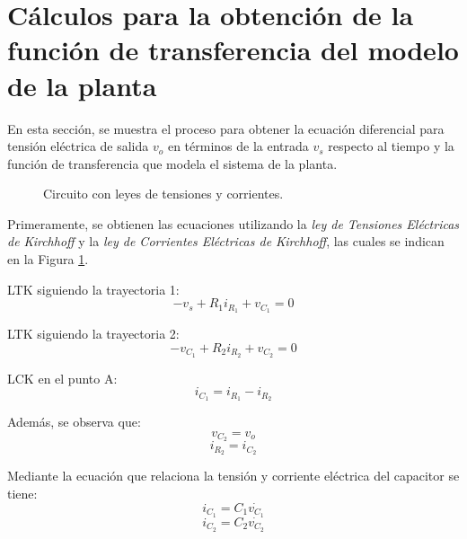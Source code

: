 
\appendices
\section{Cálculos para la obtención de la función de transferencia del modelo de la planta}\label{anexoA}

En esta sección, se muestra el proceso para obtener la ecuación diferencial para tensión eléctrica de salida $v_o$ en términos de la entrada $v_s$ respecto al tiempo y la función de transferencia que modela el sistema de la planta.

\begin{figure}[htbp]
    \centering
    \caption{Circuito con leyes de tensiones y corrientes.}
    \label{circ_leyes}
\end{figure}

Primeramente, se obtienen las ecuaciones utilizando la \textit{ley de Tensiones Eléctricas de Kirchhoff} y la \textit{ley de Corrientes Eléctricas de Kirchhoff}, las cuales se indican en la Figura \ref{circ_leyes}.

LTK siguiendo la trayectoria 1:
\begin{equation}
    -v_s + R_1 i_{R_1} + v_{C_1} = 0
    \label{LTK1}
\end{equation}

LTK siguiendo la trayectoria 2:
\begin{equation}
    -v_{C_1} + R_2 i_{R_2} + v_{C_2} = 0
    \label{LTK2}
\end{equation}

LCK en el punto A:
\begin{equation}
    i_{C_1} = i_{R_1} - i_{R_2}
    \label{LCK}
\end{equation}

Además, se observa que:
\begin{equation}
    v_{C_2} = v_o
    \label{ecdeVc2}
\end{equation}
\begin{equation}
    i_{R_2} =  i_{C_2}
    \label{eciR2}
\end{equation}

Mediante la ecuación que relaciona la tensión y corriente eléctrica del capacitor se tiene:
\begin{equation}
    i_{C_1} = C_1 \dot{v_{C_1}}
    \label{ec_capi1}
\end{equation}
\begin{equation}
    i_{C_2} = C_2 \dot{v_{C_2}}
    \label{ec_capi2}
\end{equation}


